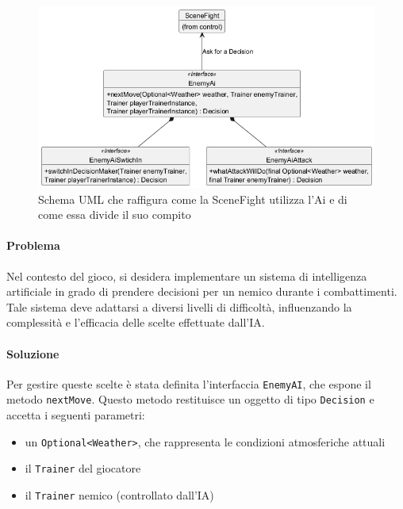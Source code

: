 \documentclass[a4paper,12pt]{report}
\begin{document}
{{\begin{figure}[H]
\centering{}
\includegraphics[width=\textwidth]{immagini/AiUml.png}
\caption{Schema UML che raffigura come la SceneFight utilizza l'Ai e di come essa divide il suo compito }
\label{immagini/AiUml.png}
\end{figure}
\paragraph{Problema} 
Nel contesto del gioco, si desidera implementare un sistema di intelligenza artificiale in grado di prendere decisioni per un nemico durante i combattimenti. Tale sistema deve adattarsi a diversi livelli di difficoltà, influenzando la complessità e l'efficacia delle scelte effettuate dall'IA.\\

\paragraph{Soluzione}Per gestire queste scelte è stata definita l'interfaccia \texttt{EnemyAI}, che espone il metodo \texttt{nextMove}. Questo metodo restituisce un oggetto di tipo \texttt{Decision} e accetta i seguenti parametri:

\begin{itemize}
    \item un \texttt{Optional<Weather>}, che rappresenta le condizioni atmosferiche attuali
    \item il \texttt{Trainer} del giocatore
    \item il \texttt{Trainer} nemico (controllato dall'IA)
\end{itemize}

}}
\end{document}
